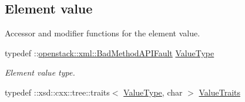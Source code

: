 \subsection*{Element value}
\label{_amgrp2ee2eae1a8c390ea033f241c027da8d6}
Accessor and modifier functions for the element value. \begin{DoxyCompactItemize}
\item 
\hypertarget{classopenstack_1_1xml_1_1BadMethod_a3b1c0c358e75287738613b415697aeba}{
typedef ::\hyperlink{classopenstack_1_1xml_1_1BadMethodAPIFault}{openstack::xml::BadMethodAPIFault} \hyperlink{classopenstack_1_1xml_1_1BadMethod_a3b1c0c358e75287738613b415697aeba}{ValueType}}
\label{classopenstack_1_1xml_1_1BadMethod_a3b1c0c358e75287738613b415697aeba}

\begin{DoxyCompactList}\small\item\em Element value type. \item\end{DoxyCompactList}\item 
\hypertarget{classopenstack_1_1xml_1_1BadMethod_a54847388abfed9286f64887c9ae76bb2}{
typedef ::xsd::cxx::tree::traits$<$ \hyperlink{classopenstack_1_1xml_1_1BadMethodAPIFault}{ValueType}, char $>$ \hyperlink{classopenstack_1_1xml_1_1BadMethod_a54847388abfed9286f64887c9ae76bb2}{ValueTraits}}
\label{classopenstack_1_1xml_1_1BadMethod_a54847388abfed9286f64887c9ae76bb2}


\end{DoxyCompactItemize}
